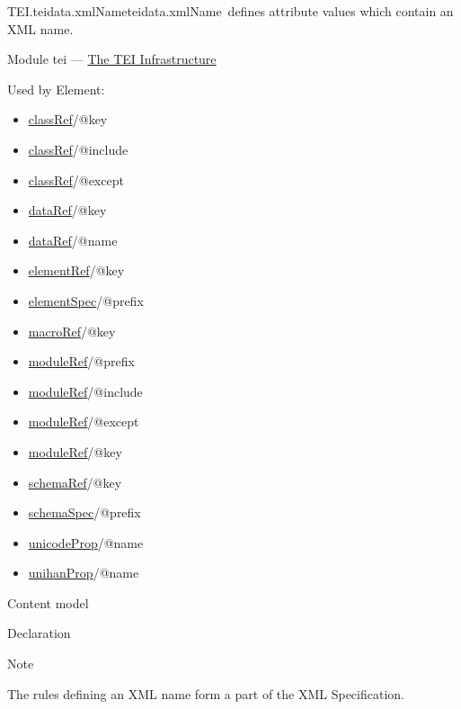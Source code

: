 \begin{reflist}
\item[]\begin{specHead}{TEI.teidata.xmlName}{teidata.xmlName} defines attribute values which contain an XML name.\end{specHead} 
    \item[{Module}]
  tei — \hyperref[ST]{The TEI Infrastructure}
    \item[{Used by}]
  Element: \begin{itemize}
\item \hyperref[TEI.classRef]{classRef}/@key
\item \hyperref[TEI.classRef]{classRef}/@include
\item \hyperref[TEI.classRef]{classRef}/@except
\item \hyperref[TEI.dataRef]{dataRef}/@key
\item \hyperref[TEI.dataRef]{dataRef}/@name
\item \hyperref[TEI.elementRef]{elementRef}/@key
\item \hyperref[TEI.elementSpec]{elementSpec}/@prefix
\item \hyperref[TEI.macroRef]{macroRef}/@key
\item \hyperref[TEI.moduleRef]{moduleRef}/@prefix
\item \hyperref[TEI.moduleRef]{moduleRef}/@include
\item \hyperref[TEI.moduleRef]{moduleRef}/@except
\item \hyperref[TEI.moduleRef]{moduleRef}/@key
\item \hyperref[TEI.schemaRef]{schemaRef}/@key
\item \hyperref[TEI.schemaSpec]{schemaSpec}/@prefix
\item \hyperref[TEI.unicodeProp]{unicodeProp}/@name
\item \hyperref[TEI.unihanProp]{unihanProp}/@name
\end{itemize} 
    \item[{Content model}]
    \item[{Declaration}]
    \item[{Note}]
  \par
The rules defining an XML name form a part of the XML Specification.
\end{reflist}  
